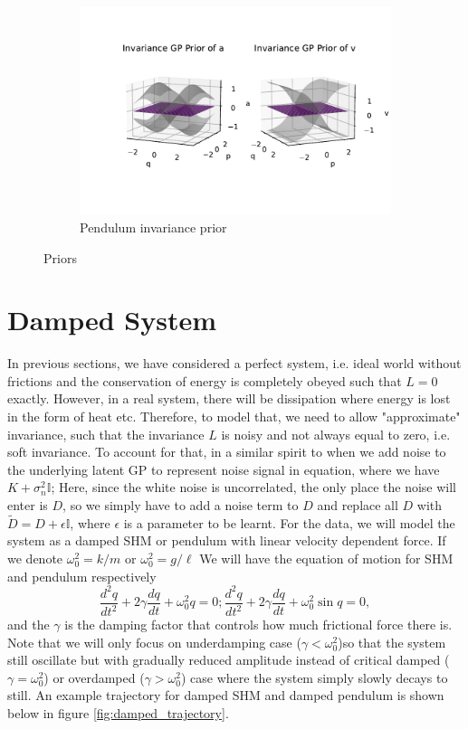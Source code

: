 \documentclass{statsmsc}
\begin{document}
\begin{figure}[H]
\begin{subfigure}[b]{0.5\linewidth}
         \includegraphics[width=\linewidth]{../codes/figures/prior_pendulum_invariance.pdf}
         \caption{Pendulum invariance prior}
         \label{fig:prior_pendulum_invariance}
     \end{subfigure}
        \caption{Priors}
        \label{fig:priors}
\end{figure}

\section{Damped System}
In previous sections, we have considered a perfect system, i.e. ideal world without frictions and the conservation of energy is completely obeyed such that $L=0$ exactly.
However, in a real system, there will be dissipation where energy is lost in the form of heat etc.  
Therefore, to model that, we need to allow "approximate" invariance, such that the invariance $L$ is noisy and not always equal to zero, i.e. soft invariance.
To account for that, in a similar spirit to when we add noise to the underlying latent GP to represent noise signal in equation, where we have $K+\sigma_n^2 \mathbb{I}$;
Here, since the white noise is uncorrelated, the only place the noise will enter is $D$, so we simply have to add a noise term to $D$ and replace all $D$ with $\tilde{D}=D+\epsilon \mathbb{I}$, where $\epsilon$ is a parameter to be learnt. 
For the data, we will model the system as a damped SHM or pendulum with linear velocity dependent force.
If we denote $\omega_0^2=k/m$ or $\omega_0^2=g/\ell$
We will have the equation of motion for SHM and pendulum respectively
$$
\frac{d^2q}{dt^2}+2\gamma\frac{dq}{dt}+\omega_0^2q=0; \frac{d^2q}{dt^2}+2\gamma\frac{dq}{dt}+\omega_0^2\sin q=0 ,
$$
and the $\gamma$ is the damping factor that controls how much frictional force there is. 
Note that we will only focus on underdamping case ($\gamma < \omega_0^2$)so that the system still oscillate but with gradually reduced amplitude instead of critical damped ($\gamma=\omega_0^2$) or overdamped ($\gamma>\omega_0^2$) case where the system simply slowly decays to still.
An example trajectory for damped SHM and damped pendulum is shown below in figure \ref{fig:damped_trajectory}.
\end{document}
